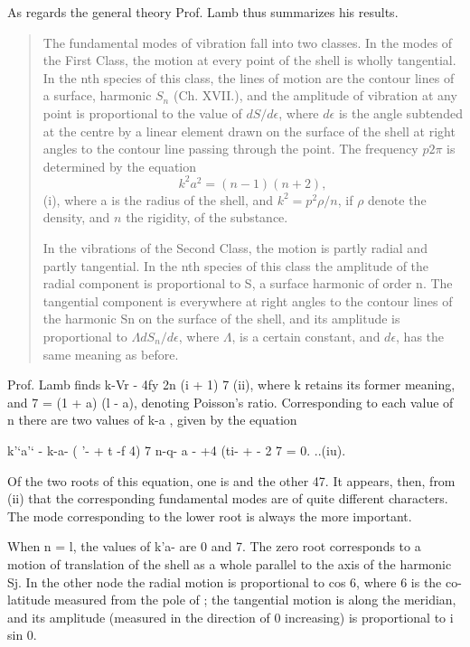 As regards the general theory Prof. Lamb thus summarizes his results.
\begin{quotation}
The fundamental modes of vibration fall into two classes. In the modes of the First
Class, the motion at every point of the shell is wholly tangential. In the nth
species of this class, the lines of motion are the contour lines of a surface,
harmonic \(S_n\) (Ch. XVII.), and the amplitude of vibration at any point is
proportional to the value of
\( dS/d \epsilon \), where \(d \epsilon \) is the angle subtended at the
centre by a linear element drawn on the surface of the shell at right angles
to the contour line passing through the point. The frequency
\( p 2 \pi \) is determined by the equation
\[ k^2 a^2 = (n-1)(n + 2),\]
(i), where a is the radius of the shell, and
\( k^2 = p^2 \rho/n\), if \(\rho \) denote the density, and
\(n\) the rigidity, of the substance.

In the vibrations of the Second Class, the
motion is partly radial and partly tangential. In the nth species of this class
the amplitude of the radial component is proportional to S, a surface harmonic
of order n. The tangential component is everywhere at right angles to the
contour lines of the harmonic Sn on the surface of the shell, and its amplitude
is proportional to
\( \Lambda  dS_n/d \epsilon \),
where \(\Lambda \), is a certain constant, and \( d \epsilon \),
has the same meaning as before.
\end{quotation}
Prof. Lamb finds k-Vr - 4fy 2n (i + 1) 7 (ii),
where k retains its former meaning, and 7 = (1 + a) (l - a),
denoting Poisson’s ratio. Corresponding to each value of n there are two values of
k-a , given by the equation

k'‘a'‘ - k-a- ( '- + t -f 4) 7 n-q- a - +4 (ti- + - 2 7 = 0. ..(iu).

Of the two roots of this equation, one is  and the other 47. It appears, then,
from (ii) that the corresponding fundamental modes are of quite different
characters. The mode corresponding to the lower root is always the more important.

 When n = l, the values of k'a- are 0 and 7. The zero root corresponds to a
motion of translation of the shell as a whole parallel to the axis of the
harmonic Sj. In the other node the radial motion is proportional to cos 6,
where 6 is the co-latitude measured from the pole of ; the tangential motion
is along the meridian, and its amplitude
(measured in the direction of 0 increasing) is proportional to i sin 0.

